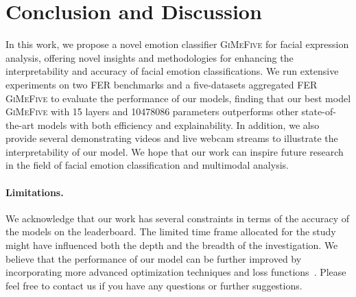 \section{Conclusion and Discussion}
\label{sec:conclusion}

In this work, we propose a novel emotion classifier \textsc{GiMeFive} for facial expression analysis, 
offering novel insights and methodologies for enhancing the interpretability and accuracy of facial emotion classifications. 
We run extensive experiments on two FER benchmarks and a five-datasets aggregated FER \textsc{GiMeFive} to evaluate the performance of our models, 
finding that our best model \textsc{GiMeFive} 
with 15 layers and 10478086 parameters outperforms other state-of-the-art models with both efficiency and explainability. 
In addition, 
we also provide several demonstrating videos and live webcam streams to illustrate the interpretability of our model. 
We hope that our work can inspire future research in the field of facial emotion classification and multimodal analysis. 

\paragraph{Limitations.}
We acknowledge that our work has several constraints in terms of the accuracy of the models on the leaderboard. 
The limited time frame allocated for the study might have influenced both the depth and the breadth of the investigation. 
We believe that the performance of our model can be further improved by incorporating more advanced optimization techniques 
and loss functions~\cite{LiGL22}. 
Please feel free to contact us if you have any questions or further suggestions.

\newpage
